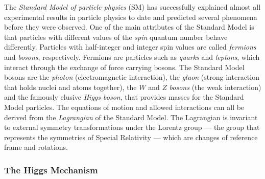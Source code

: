\documentclass[twoside,english]{uiofysmaster}
\begin{document}
The \textit{Standard Model of particle physics} (SM) has successfully explained almost all experimental results in particle physics to date and predicted several phenomena before they were observed. One of the main attributes of the Standard Model is that particles with different values of the \textit{spin} quantum number behave differently. Particles with half-integer and integer spin values are called \textit{fermions} and \textit{bosons}, respectively. Fermions are particles such as \textit{quarks} and \textit{leptons}, which interact through the exchange of force carrying bosons. The Standard Model bosons are the \textit{photon} (electromagnetic interaction), the \textit{gluon} (strong interaction that holds nuclei and atoms together), the $W$ and $Z$ \textit{bosons} (the weak interaction) and the famously elusive \textit{Higgs boson}, that provides masses for the Standard Model particles. The equations of motion and allowed interactions can all be derived from the \textit{Lagrangian} of the Standard Model. The Lagrangian is invariant to external symmetry transformations under the Lorentz group --- the group that represents the symmetries of Special Relativity --- which are changes of reference frame and rotations. 

\subsubsection{The Higgs Mechanism}\label{Sec:: phys back : The Higgs Mechanism}
\end{document}
